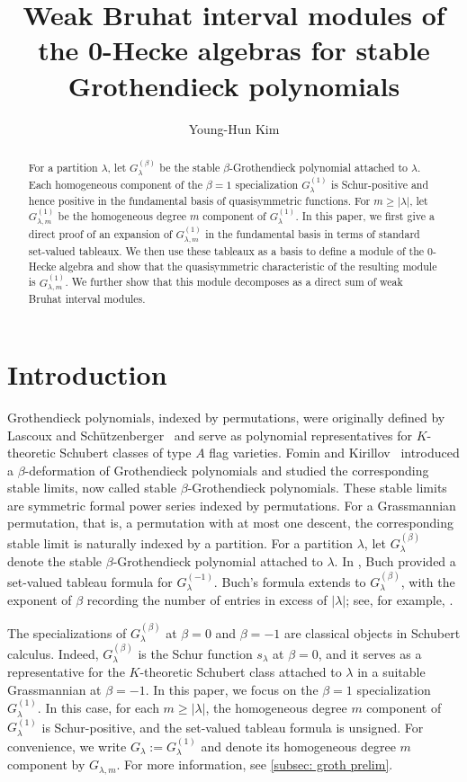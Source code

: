\documentclass[12pt, reqno]{amsart}
\title[Weak Bruhat interval modules for stable Grothendieck polynomials]
{Weak Bruhat interval modules of the 0-Hecke algebras for stable Grothendieck polynomials}
\author[Y.-H. Kim]{Young-Hun Kim}
\numberwithin{equation}{section}
\numberwithin{figure}{section}
\numberwithin{table}{section}
\theoremstyle{definition}
\begin{document}
\begin{abstract}
For a partition $\lambda$, let $G_\lambda^{(\beta)}$ be the stable $\beta$-Grothendieck polynomial attached to $\lambda$. Each homogeneous component of the $\beta = 1$ specialization $G_\lambda^{(1)}$ is Schur-positive and hence positive in the fundamental basis of quasisymmetric functions. For $m\ge|\lambda|$, let $G_{\lambda,m}^{(1)}$ be the homogeneous degree $m$ component of $G_\lambda^{(1)}$. In this paper, we first give a direct proof of an expansion of $G_{\lambda,m}^{(1)}$ in the fundamental basis in terms of standard set-valued tableaux. We then use these tableaux as a basis to define a module of the $0$-Hecke algebra and show that the quasisymmetric characteristic of the resulting module is $G_{\lambda,m}^{(1)}$. We further show that this module decomposes as a direct sum of weak Bruhat interval modules.
\end{abstract}


\maketitle


\section{Introduction}\label{Sec: introduction}


Grothendieck polynomials, indexed by permutations, were originally defined by Lascoux and Sch\"utzenberger~\cite{LS82} and serve as polynomial representatives for $K$-theoretic Schubert classes of type $A$ flag varieties.
Fomin and Kirillov~\cite{FK94} introduced a $\beta$-deformation of Grothendieck polynomials and studied the corresponding stable limits, now called stable $\beta$-Grothendieck polynomials.
These stable limits are symmetric formal power series indexed by permutations.
For a Grassmannian permutation, that is, a permutation with at most one descent, the corresponding stable limit is naturally indexed by a partition.
For a partition $\lambda$, let $G_\lambda^{(\beta)}$ denote the stable $\beta$-Grothendieck polynomial attached to $\lambda$.
In \cite{Buch02}, Buch provided a set-valued tableau formula for $G_\lambda^{(-1)}$.
Buch's formula extends to $G_\lambda^{(\beta)}$, with the exponent of $\beta$ recording the number of entries in excess of $|\lambda|$; see, for example, \cite{McNamara06,PS19,MPS21}.


The specializations of $G_\lambda^{(\beta)}$ at $\beta=0$ and $\beta=-1$ are classical objects in Schubert calculus.
Indeed, $G_\lambda^{(\beta)}$ is the Schur function $s_\lambda$ at $\beta=0$, and it serves as a representative for the $K$-theoretic Schubert class attached to $\lambda$ in a suitable Grassmannian at $\beta=-1$.
In this paper, we focus on the $\beta=1$ specialization $G_\lambda^{(1)}$.
In this case, for each $m\ge|\lambda|$, the homogeneous degree $m$ component of $G_\lambda^{(1)}$ is Schur-positive, and the set-valued tableau formula is unsigned.
For convenience, we write $G_\lambda:=G_\lambda^{(1)}$ and denote its homogeneous degree $m$ component by $G_{\lambda,m}$.
For more information, see \cref{subsec: groth prelim}.
\end{document}
